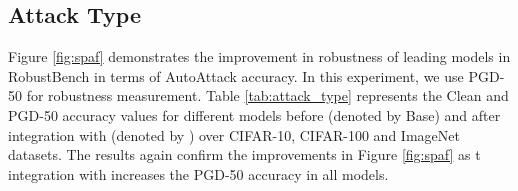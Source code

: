 \documentclass[conference]{IEEEtran}
\begin{document}
\begin{table}[h]
\footnotesize
\caption{Clean and APGD accuracy of ResNet-18 model with GELU activation function over CIFAR-10 test set before (Base denoted by $\alpha=0$ in the table) and after the application of \sys technique for \emph{Main Path} (application of \sys to activation functions in the main path of residual block) and \emph{After Addition} (application of \sys to activation functions operating after addition of main path result and residual data) cases.}
\renewcommand{\arraystretch}{1.3}
\label{tab:connection}
\centering
\setlength\tabcolsep{2pt}
\end{table}



\subsection{Attack Type}\label{abl:pgd50}
Figure \mbox{\ref{fig:spaf}} demonstrates the improvement in robustness of leading models in RobustBench in terms of AutoAttack accuracy. In this experiment, we use PGD-50 \mbox{\cite{tdlmm18}} for robustness measurement. Table \mbox{\ref{tab:attack_type}} represents the Clean and PGD-50 accuracy values for different models before (denoted by Base) and after integration with \sys (denoted by \sys) over CIFAR-10, CIFAR-100 and ImageNet datasets. The results again confirm the improvements in Figure \mbox{\ref{fig:spaf}} as t integration with \sys increases the PGD-50 accuracy in all models.
\end{document}
